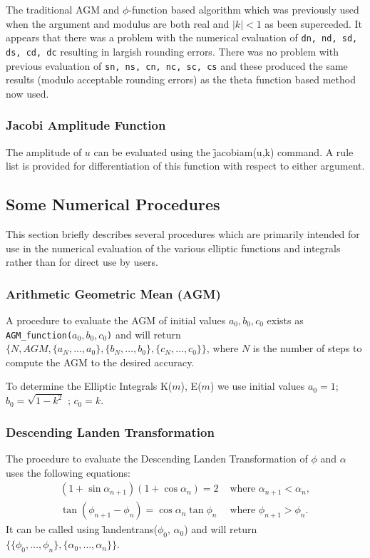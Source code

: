 The traditional AGM and  $\phi$-function based algorithm which was previously
used when the argument and modulus are both real and $|k| < 1$ as been
superceded. It appears that there was a problem with the numerical evaluation
of \texttt{dn, nd, sd, ds, cd, dc} resulting in largish rounding errors. There
was no problem with previous evaluation of \texttt{sn, ns, cn, nc, sc, cs} and
these produced the same results (modulo acceptable rounding errors) as the
theta function based method now used.

\subsubsection{Jacobi Amplitude Function}
\hypertarget{operator:JACOBIAM}{}
The amplitude of $u$ can be evaluated using the \f{jacobiam(u,k)}
command.  A rule list is provided for differentiation of this
function with respect to either argument.

\subsection{Some Numerical Procedures}
This section briefly describes several procedures which are primarily
intended for use in the numerical evaluation of the various elliptic
functions and integrals rather than for direct use by users.

\subsubsection{Arithmetic Geometric Mean (AGM)}
\hypertarget{operator:AGM_FUNCTION}{}
A procedure to evaluate the AGM of initial values \(a_0,b_0,c_0\)
exists as \\
\texttt{AGM\_function(\(a_0,b_0,c_0\))} and will return \\
$\{ N, AGM, \{ a_N, \ldots ,a_0\}, \{ b_N, \ldots ,b_0\},
\{c_N, \ldots ,c_0\}\}$,
where $N$ is the number of steps to compute the AGM to the
desired accuracy.

To determine the Elliptic Integrals K($m$), E($m$) we use initial values
\(a_0 = 1\); \(b_0 = \sqrt{1-k^2}\) ; \(c_0 = k\).

\subsubsection{Descending Landen Transformation}
The procedure to evaluate the Descending Landen Transformation of
$\phi$ and $\alpha$ uses the following equations:
\begin{align*}
 (1+\sin \alpha_{n+1})(1+\cos \alpha_n)=2 &\text{ where } \alpha_{n+1}<\alpha_n, \\
  \tan(\phi_{n+1}-\phi_n)=\cos \alpha_n \tan \phi_n & \text{ where } \phi_{n+1}>\phi_n.
\end{align*}
It can be called using \f{landentrans}($\phi_0$, $\alpha_0$)
and will return \\
$\{\{\phi_0, \ldots ,\phi_n\},\{\alpha_0, \ldots ,\alpha_n\}\}$.

